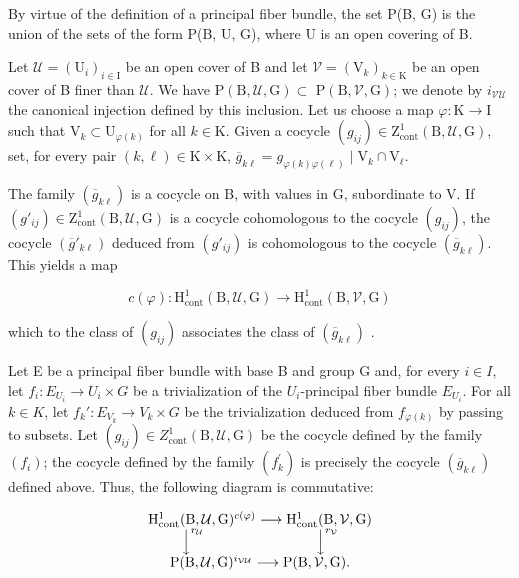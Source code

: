 By virtue of the definition of a principal fiber bundle, the set P(B, G) is the union of the sets of the form P(B, U, G), where U is an open covering of B.

Let \(\mathcal{U} = (\mathrm{U}_i)_{i\in \mathrm{I}}\) be an open cover of B and let \(\mathcal{V} = (\mathrm{V}_k)_{k\in \mathrm{K}}\) be an open cover of B finer than \(\mathcal{U}\). We have \(\mathrm{P(B,\mathcal{U},G)}\subset\) \(\mathrm{P(B,\mathcal{V},G)}\); we denote by \(i_{\mathcal{V}\mathcal{U}}\) the canonical injection defined by this inclusion. Let us choose a map \(\varphi \colon \mathrm{K}\to \mathrm{I}\) such that \(\mathrm{V}_k\subset \mathrm{U}_{\varphi (k)}\) for all \(k\in \mathrm{K}\). Given a cocycle \((g_{ij})\in \mathrm{Z}_{\mathrm{cont}}^1 (\mathrm{B},\mathcal{U},\mathrm{G})\), set, for every pair \((k,\ell)\in \mathrm{K}\times \mathrm{K}\), \(\overline{g}_{k\ell} = g_{\varphi (k)\varphi (\ell)}\mid \mathrm{V}_k\cap \mathrm{V}_\ell\).

The family \((\overline{g}_{k\ell})\) is a cocycle on B, with values in G, subordinate to V. If \((g'_{ij}) \in \mathrm{Z}_{\mathrm{cont}}^{1}(\mathrm{B}, \mathcal{U}, \mathrm{G})\) is a cocycle cohomologous to the cocycle \((g_{ij})\), the cocycle \((\overline{g}'_{k\ell})\) deduced from \((g'_{ij})\) is cohomologous to the cocycle \((\overline{g}_{k\ell})\). This yields a map

\[
c (\varphi) \colon \mathrm{H} _ {\mathrm{cont}} ^ {1} (\mathrm{B}, \mathcal {U}, \mathrm{G}) \to \mathrm{H} _ {\mathrm{cont}} ^ {1} (\mathrm{B}, \mathcal {V}, \mathrm{G})
\]

which to the class of \((g_{ij})\) associates the class of \((\overline{g}_{k\ell})\) .

Let E be a principal fiber bundle with base B and group G and, for every \(i \in I\), let \(f_i: E_{U_i} \to U_i \times G\) be a trivialization of the \(U_i\)-principal fiber bundle \(E_{U_i}\). For all \(k \in K\), let \(f_k' : E_{V_k} \to V_k \times G\) be the trivialization deduced from \(f_{\varphi(k)}\) by passing to subsets. Let \((g_{ij}) \in Z_{\mathrm{cont}}^1(\mathrm{B}, \mathcal{U}, \mathrm{G})\) be the cocycle defined by the family \((f_i)\); the cocycle defined by the family \((f_{k}^{\prime})\) is precisely the cocycle \((\overline{g}_{k\ell})\) defined above. Thus, the following diagram is commutative:

\[
\begin{array}{c} \mathrm{H} _ {\mathrm{cont}} ^ {1} (\mathrm{B}, \mathcal {U}, \mathrm{G}) ^ {c (\varphi)} \longrightarrow \mathrm{H} _ {\mathrm{cont}} ^ {1} (\mathrm{B}, \mathcal {V}, \mathrm{G}) \\ \Big \downarrow^ {r _ {\mathcal {U}}} \qquad \qquad \qquad \qquad \Big \downarrow^ {r _ {\mathcal {V}}} \\ \mathrm{P} (\mathrm{B}, \mathcal {U}, \mathrm{G}) ^ {i _ {\mathcal {V} \mathcal {U}}} \longrightarrow \mathrm{P} (\mathrm{B}, \mathcal {V}, \mathrm{G}). \end{array}
\]

